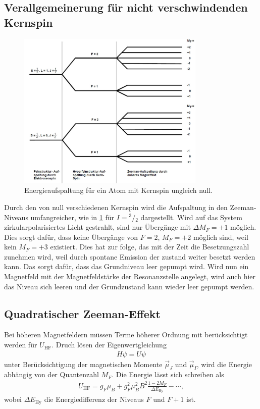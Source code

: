 \subsection{Verallgemeinerung für nicht verschwindenden Kernspin}
\begin{figure}[h!]
	\centering
	\includegraphics[width = 0.8\textwidth]{../Grafiken/BeispielAlkali.pdf}
	\caption{Energieaufspaltung für ein Atom mit Kernspin ungleich null.\cite{V21}}\label{fig:Kernspin}
\end{figure}
Durch den von null verschiedenen Kernspin wird die Aufspaltung in den Zeeman-Niveaus umfangreicher, wie in \cref{fig:Kernspin} für $I={}^3\!/\!_2$ dargestellt.
Wird auf das System zirkularpolarisiertes Licht gestrahlt, sind nur Übergänge mit $\Delta M_F=+1$ möglich.
Dies sorgt dafür, dass keine Übergänge von $F=2$, $M_F=+2$ möglich sind, weil kein $M_F=+3$ existiert.
Dies hat zur folge, das mit der Zeit die Besetzungszahl zunehmen wird, weil durch spontane Emission der zustand weiter besetzt werden kann.
Das sorgt dafür, dass das Grundniveau leer gepumpt wird.
Wird nun ein Magnetfeld mit der Magnetfeldstärke der Resonanzstelle angelegt, wird auch hier das Niveau sich leeren und der Grundzustand kann wieder leer gepumpt werden.

\newpage
\subsection{Quadratischer Zeeman-Effekt}
Bei höheren Magnetfeldern müssen Terme höherer Ordnung mit berücksichtigt werden für $U_\text{HF}$.
Druch lösen der Eigenwertgleichung 
\begin{align}
	H\psi = U\psi
\end{align}
unter Berücksichtigung der magnetischen Momente $\vec{\mu}_J$ und $\vec{\mu}_I$, wird die Energie abhängig von der Quantenzahl $M_F$.
Die Energie lässt sich schreiben als
\begin{align}
	U_\text{HF}= g_F\mu_B+g_F^2\mu_B^2B^2\frac{1-2M_F}{\Delta E_\text{Hy}}-\cdots,
\end{align}
wobei $\Delta E_\text{Hy}$ die Energiedifferenz der Niveaus $F$ und $F+1$ ist.
